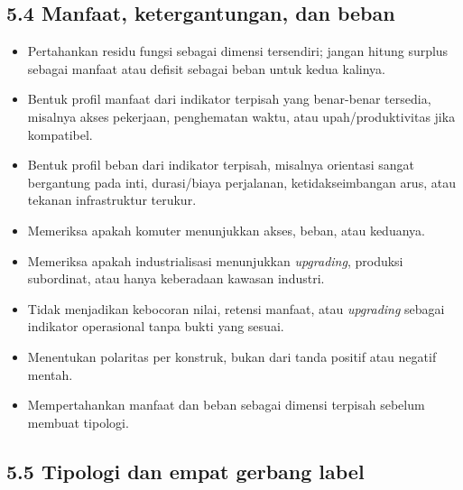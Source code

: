 \documentclass[
  indonesian,
  11pt,
]{article}
\providecommand{\tightlist}{%
  \setlength{\itemsep}{0pt}\setlength{\parskip}{0pt}}
\renewcommand{\tightlist}{%
  \setlength{\itemsep}{0.22em}%
  \setlength{\parskip}{0pt}%
}
\begin{document}
\subsection{5.4 Manfaat, ketergantungan, dan
beban}\label{manfaat-ketergantungan-dan-beban}

\begin{itemize}
\tightlist
\item[$\square$]
  Pertahankan residu fungsi sebagai dimensi tersendiri; jangan hitung
  surplus sebagai manfaat atau defisit sebagai beban untuk kedua
  kalinya.
\item[$\square$]
  Bentuk profil manfaat dari indikator terpisah yang benar-benar
  tersedia, misalnya akses pekerjaan, penghematan waktu, atau
  upah/produktivitas jika kompatibel.
\item[$\square$]
  Bentuk profil beban dari indikator terpisah, misalnya orientasi sangat
  bergantung pada inti, durasi/biaya perjalanan, ketidakseimbangan arus,
  atau tekanan infrastruktur terukur.
\item[$\square$]
  Memeriksa apakah komuter menunjukkan akses, beban, atau keduanya.
\item[$\square$]
  Memeriksa apakah industrialisasi menunjukkan \emph{upgrading},
  produksi subordinat, atau hanya keberadaan kawasan industri.
\item[$\square$]
  Tidak menjadikan kebocoran nilai, retensi manfaat, atau
  \emph{upgrading} sebagai indikator operasional tanpa bukti yang
  sesuai.
\item[$\square$]
  Menentukan polaritas per konstruk, bukan dari tanda positif atau
  negatif mentah.
\item[$\square$]
  Mempertahankan manfaat dan beban sebagai dimensi terpisah sebelum
  membuat tipologi.
\end{itemize}

\subsection{5.5 Tipologi dan empat gerbang
label}\label{tipologi-dan-empat-gerbang-label}
\end{document}
